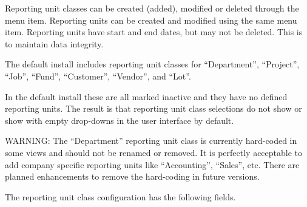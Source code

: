 Reporting unit classes can be created (added), modified or deleted through the  menu item. Reporting units can be created and modified using the same menu item.  Reporting units have start and end dates, but may not be deleted. This is to maintain data integrity.

The default install includes reporting unit classes for ``Department'', ``Project'', ``Job'', ``Fund'', ``Customer'', ``Vendor'', and ``Lot''.

In the default install these are all marked inactive and they have no defined reporting units. The result is that reporting unit class selections do not show or show with empty drop-downs in the user interface by default.

{\color{red}WARNING:} The ``Department'' reporting unit class is currently hard-coded in some views and should not be renamed or removed. 
It is perfectly acceptable to add company specific reporting units like ``Accounting'', ``Sales'', etc.
There are planned enhancements to remove the hard-coding in future versions.

The reporting unit class configuration has the following fields. 

